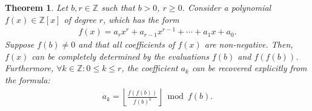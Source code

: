 \documentclass{article}
\theoremstyle{plain}
\newtheorem{theorem}{Theorem}[section]
\newcommand{\floor}[1]{\left\lfloor #1 \right\rfloor}
\begin{document}
\begin{theorem} \label{theorem:encoding}
Let $b, r \in \mathbb{Z}$ such that $b > 0$, $r \geq 0$. Consider a polynomial $f(x) \in \mathbb{Z}[x]$ of degree $r$, which has the form
\begin{align*}
    f(x) = a_r x^r + a_{r-1} x^{r-1} + \cdots + a_1 x + a_0 .
\end{align*}
Suppose $f(b) \not= 0$ and that all coefficients of $f(x)$ are non-negative. Then, $f(x)$ can be completely determined by the evaluations $f(b)$ and $f(f(b))$. Furthermore, $\forall k \in \mathbb{Z} : 0 \leq k \leq r$, the coefficient $a_k$ can be recovered explicitly from the formula:
\begin{align*}
a_k = \floor{\frac{f(f(b))}{f(b)^{k}}} \bmod{f(b)} .
\end{align*}
\end{theorem}
\end{document}
